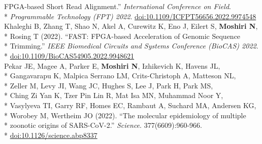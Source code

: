 \documentclass[margin,line]{res}
\begin{document}
\begin{resume}
\hspace*{9.5mm} FPGA-based Short Read Alignment.'' \textit{International Conference on Field}.\\*\vspace{2mm}
\hspace*{7mm} \textit{Programmable Technology (FPT) 2022}. \href{https://doi.org/10.1109/ICFPT56656.2022.9974548}{doi:10.1109/ICFPT56656.2022.9974548}\\
\hspace*{4mm} Khaleghi B, Zhang T, Shao N, Akel A, Curewitz K, Eno J, Eilert S, \textbf{Moshiri N},\\*
\hspace*{9.5mm} Rosing T (2022). ``FAST: FPGA-based Acceleration of Genomic Sequence\\*
\hspace*{9.5mm} Trimming.'' \textit{IEEE Biomedical Circuits and Systems Conference (BioCAS) 2022}.\\*\vspace{2mm}
\hspace*{8mm} \href{https://doi.org/10.1109/BioCAS54905.2022.9948621}{doi:10.1109/BioCAS54905.2022.9948621}\\
\hspace*{4mm} Pekar JE, Magee A, Parker E, \textbf{Moshiri N}, Izhikevich K, Havens JL,\\*
\hspace*{9.5mm} Gangavarapu K, Malpica Serrano LM, Crits-Christoph A, Matteson NL,\\*
\hspace*{9.5mm} Zeller M, Levy JI, Wang JC, Hughes S, Lee J, Park H, Park MS,\\*
\hspace*{9.5mm} Ching Zi Yan K, Tzer Pin Lin R, Mat Isa MN, Muhammad Noor Y,\\*
\hspace*{9.5mm} Vasylyeva TI, Garry RF, Homes EC, Rambaut A, Suchard MA, Andersen KG,\\*
\hspace*{9.5mm} Worobey M, Wertheim JO (2022). ``The molecular epidemiology of multiple\\*
\hspace*{9.5mm} zoonotic origins of SARS-CoV-2.'' \textit{Science}. 377(6609):960-966.\\*\vspace{2mm}
\hspace*{8mm} \href{https://doi.org/10.1126/science.abp8337}{doi:10.1126/science.abp8337}\\

\end{resume}
\end{document}
